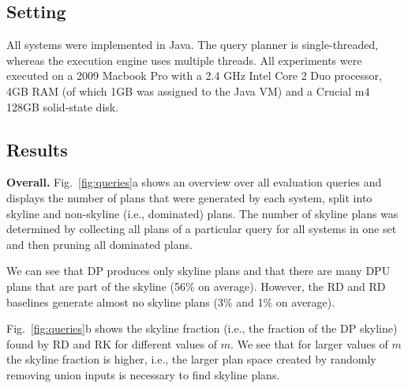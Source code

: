 




\subsection{Setting}
All systems were implemented in Java. The query planner is
single-threaded, whereas the execution engine uses multiple
threads. All experiments were executed on a 2009 Macbook Pro with a
2.4 GHz Intel Core 2 Duo processor, 4GB RAM (of which 1GB was assigned
to the Java VM) and a Crucial m4 128GB solid-state disk.


\subsection{Results}

\textbf{Overall.} Fig.~\ref{fig:queries}a shows an overview over all
evaluation queries and displays the number of plans that were
generated by each system, split into skyline and non-skyline (i.e.,
dominated) plans. The number of skyline plans was determined by
collecting all plans of a particular query for all systems in one set
and then pruning all dominated plans. 

We can see that DP produces only skyline plans and that there are many
DPU plans that are part of the skyline (56\% on average). However, the
RD and RD baselines generate almost no skyline plans (3\% and 1\% on
average). 

Fig.~\ref{fig:queries}b shows the skyline fraction (i.e., the fraction
of the DP skyline) found by RD and RK for different values of $m$. We
see that for larger values of $m$ the skyline fraction is higher,
i.e., the larger plan space created by randomly removing union inputs
is necessary to find skyline plans.

